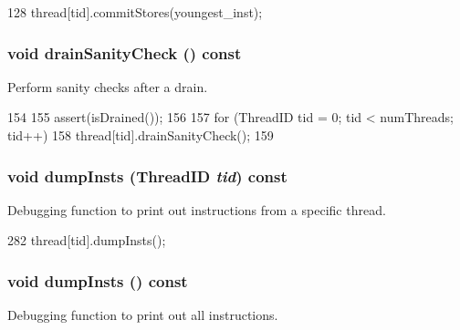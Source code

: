 \begin{DoxyCode}
128     { thread[tid].commitStores(youngest_inst); }
\end{DoxyCode}
\hypertarget{classLSQ_a0240eb42fa57fe5d3788093f62b77347}{
\subsubsection[{drainSanityCheck}]{\setlength{\rightskip}{0pt plus 5cm}void drainSanityCheck () const}}
\label{classLSQ_a0240eb42fa57fe5d3788093f62b77347}
Perform sanity checks after a drain. 


\begin{DoxyCode}
154 {
155     assert(isDrained());
156 
157     for (ThreadID tid = 0; tid < numThreads; tid++)
158         thread[tid].drainSanityCheck();
159 }
\end{DoxyCode}
\hypertarget{classLSQ_a720e1bd0f477c100c9c9ca0b6ced109f}{
\subsubsection[{dumpInsts}]{\setlength{\rightskip}{0pt plus 5cm}void dumpInsts ({\bf ThreadID} {\em tid}) const}}
\label{classLSQ_a720e1bd0f477c100c9c9ca0b6ced109f}
Debugging function to print out instructions from a specific thread. 


\begin{DoxyCode}
282     { thread[tid].dumpInsts(); }
\end{DoxyCode}
\hypertarget{classLSQ_ad0dcc54f6823ec37a9ab4eef289e2305}{
\subsubsection[{dumpInsts}]{\setlength{\rightskip}{0pt plus 5cm}void dumpInsts () const}}
\label{classLSQ_ad0dcc54f6823ec37a9ab4eef289e2305}
Debugging function to print out all instructions. 



